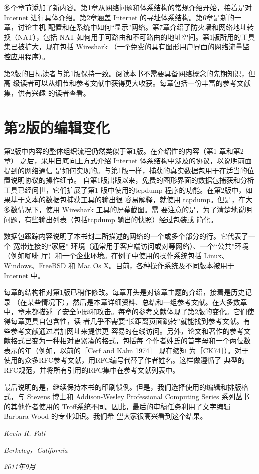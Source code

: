 多个章节添加了新内容。第1章从网络问题和体系结构的常规介绍开始，接着是对
Internet 进行具体介绍。第2章涵盖 Internet 的寻址体系结构。第6章是新的一章，讨论主机
配置和在系统中如何“显示”网络。第7章介绍了防火墙和网络地址转换（NAT），包括 NAT
如何用于可路由和不可路由的地址空间。第1版所用的工具集已被扩大，现在包括 Wireshark
（一个免费的具有图形用户界面的网络流量监控应用程序）。

第2版的目标读者与第1版保持一致。阅读本书不需要具备网络概念的先期知识，但高
级读者可以从细节和参考文献中获得更大收获。每章包括一份丰富的参考文献集，供有兴趣
的读者查看。

\section*{第2版的编辑变化}
第2版中内容的整体组织流程仍然类似于第1版。在介绍性的内容（第1 章和第2章）
之后，采用自底向上方式介绍 Internet 体系结构中涉及的协议，以说明前面提到的网络通信
是如何实现的。与第1版一样，捕获的真实数据包用于在适当的位置说明协议的操作细节。
自第1版出版以来，免费的图形界面的数据包捕获和分析工具已经问世，它们扩展了第1
版中使用的tcpdump 程序的功能。在第2版中，如果基于文本的数据包捕获工具的输出很
容易解释，就使用 tcpdump。但是，在大多数情况下，使用 Wireshark 工具的屏幕截图。需
要注意的是，为了清楚地说明问题，有些输出列表（包括tcpdump 输出的快照）经过包装或
简化。

数据包跟踪内容说明了本书封二所描述的网络的一个或多个部分的行。它代表了一个
宽带连接的“家庭” 环境（通常用于客户端访问或对等网络）、一个“公共”环境（例如咖啡
厅）和一个企业环境。在例子中使用的操作系统包括 Linux、Windows、FreeBSD 和 Mac Os
X。目前，各种操作系统及不同版本被用于 Internet 中。

每章的结构相对第1版已稍作修改。每章开头是对该章主题的介绍，接着是历史记录
（在某些情况下），然后是本章详细资料、总结和一组参考文献。在大多数章中，章末都描述
了安全问题和攻击。每章的参考文献体现了第2版的变化。它们使得每章更具自包含性，读
者几乎不需要“长距离页面跳转”就能找到参考文献。有些参考文献通过增加网址来提供更
容易的在线访问。另外，论文和著作的参考文献格式已变为一种相对更紧凑的格式，包括每
个作者姓氏的首字母和一个两位数表示的年（例如，以前的［Cerf and Kahn 1974］ 现在缩短
为［CK74］）。对于使用的众多RFC参考文献，用RFC编号代替了作者姓名。这样做遵循了
典型的RFC规范，并将所有引用的RFC集中在参考文献列表中。

最后说明的是，继续保持本书的印刷惯例。但是，我们选择使用的编辑和排版格式，与
Stevens 博士和 Addison-Wesley Professional Computing Series 系列丛书的其他作者使用的
Troff系统不同。因此，最后的审稿任务利用了文字编辑 Barbara Wood 的专业知识。我们希
望大家很高兴看到这个结果。

\begin{flushright}
  \emph{Kevin R. Fall}
\end{flushright}
\begin{flushright}
  \emph{Berkeley，California}
\end{flushright}
\begin{flushright}
  \emph{2011年9月}
\end{flushright}
